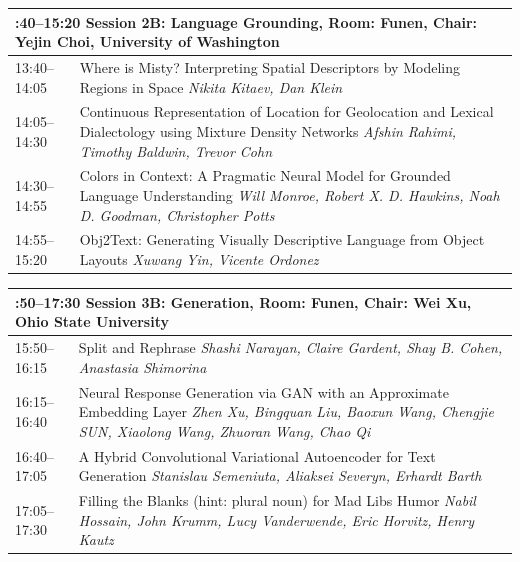 \documentclass{book}
\renewcommand{\large}{\fontsize{72}{80}\selectfont}
\renewcommand{\large}{\fontsize{82}{90}\selectfont}
\begin{document}
\begin{tabular}{p{20cm}p{70cm}}
  \multicolumn{2}{p{\textwidth}}{\bfseries\large 13:40--15:20 Session 2B: Language Grounding, Room:  Funen, Chair:  Yejin Choi, University of Washington} \\\hline

    
    13:40--14:05
    &	Where is Misty? Interpreting Spatial Descriptors by Modeling Regions in Space \newline 
    {\itshape Nikita Kitaev, Dan Klein} \\
    
    14:05--14:30
    &	Continuous Representation of Location for Geolocation and Lexical Dialectology using Mixture Density Networks \newline 
    {\itshape Afshin Rahimi, Timothy Baldwin, Trevor Cohn} \\
    
    14:30--14:55
    &	Colors in Context: A Pragmatic Neural Model for Grounded Language Understanding \newline 
    {\itshape Will Monroe, Robert X. D. Hawkins, Noah D. Goodman, Christopher Potts} \\
    
    14:55--15:20
    &	Obj2Text: Generating Visually Descriptive Language from Object Layouts \newline 
    {\itshape Xuwang Yin, Vicente Ordonez} \\
    
\end{tabular}
\vspace*{\fill}

\begin{tabular}{p{20cm}p{70cm}}
  \multicolumn{2}{p{\textwidth}}{\bfseries\large 15:50--17:30 Session 3B: Generation, Room:  Funen, Chair:  Wei Xu, Ohio State University} \\\hline

    
    15:50--16:15
    &	Split and Rephrase \newline 
    {\itshape Shashi Narayan, Claire Gardent, Shay B. Cohen, Anastasia Shimorina} \\
    
    16:15--16:40
    &	Neural Response Generation via GAN with an Approximate Embedding Layer \newline 
    {\itshape Zhen Xu, Bingquan Liu, Baoxun Wang, Chengjie SUN, Xiaolong Wang, Zhuoran Wang, Chao Qi} \\
    
    16:40--17:05
    &	A Hybrid Convolutional Variational Autoencoder for Text Generation \newline 
    {\itshape Stanislau Semeniuta, Aliaksei Severyn, Erhardt Barth} \\
    
    17:05--17:30
    &	Filling the Blanks (hint: plural noun) for Mad Libs Humor \newline 
    {\itshape Nabil Hossain, John Krumm, Lucy Vanderwende, Eric Horvitz, Henry Kautz} \\
    
\end{tabular}
\vspace*{\fill}
\end{document}
